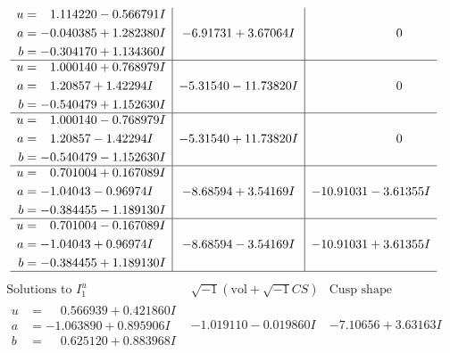 \documentclass[1p]{elsarticle_modified}
\theoremstyle{definition}
\newcommand{\I}{\sqrt{-1}}
\begin{document}
$$\begin{array}{c|c|c}
\begin{aligned}
u &= \phantom{-}1.114220 - 0.566791 I \\
a &= -0.040385 + 1.282380 I \\
b &= -0.304170 + 1.134360 I\end{aligned}
 & -6.91731 + 3.67064 I & \phantom{-0.000000 } 0 \\ \hline\begin{aligned}
u &= \phantom{-}1.000140 + 0.768979 I \\
a &= \phantom{-}1.20857 + 1.42294 I \\
b &= -0.540479 + 1.152630 I\end{aligned}
 & -5.31540 - 11.73820 I & \phantom{-0.000000 } 0 \\ \hline\begin{aligned}
u &= \phantom{-}1.000140 - 0.768979 I \\
a &= \phantom{-}1.20857 - 1.42294 I \\
b &= -0.540479 - 1.152630 I\end{aligned}
 & -5.31540 + 11.73820 I & \phantom{-0.000000 } 0 \\ \hline\begin{aligned}
u &= \phantom{-}0.701004 + 0.167089 I \\
a &= -1.04043 - 0.96974 I \\
b &= -0.384455 - 1.189130 I\end{aligned}
 & -8.68594 + 3.54169 I & -10.91031 - 3.61355 I \\ \hline\begin{aligned}
u &= \phantom{-}0.701004 - 0.167089 I \\
a &= -1.04043 + 0.96974 I \\
b &= -0.384455 + 1.189130 I\end{aligned}
 & -8.68594 - 3.54169 I & -10.91031 + 3.61355 I\\
 \hline 
 \end{array}$$\newpage$$\begin{array}{c|c|c}  
\text{Solutions to }I^u_{1}& \I (\text{vol} + \sqrt{-1}CS) & \text{Cusp shape}\\
 \hline 
\begin{aligned}
u &= \phantom{-}0.566939 + 0.421860 I \\
a &= -1.063890 + 0.895906 I \\
b &= \phantom{-}0.625120 + 0.883968 I\end{aligned}
 & -1.019110 - 0.019860 I & -7.10656 + 3.63163 I \\ \hline\begin{aligned}

\end{aligned}
\end{array}$$
\end{document}
